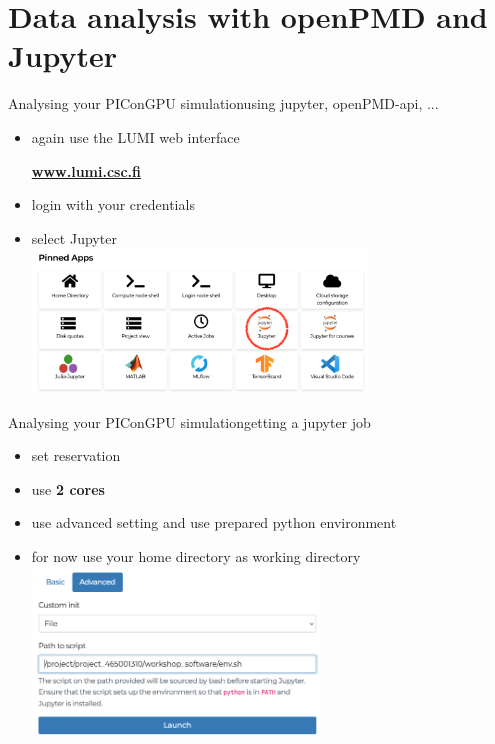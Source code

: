 \documentclass[
  aspectratio=169,
  10pt
]{beamer}
\begin{document}
\part{Data analysis with openPMD and Jupyter}
\frame{\partpage}


\begin{frame}[t,fragile]{Analysing your PIConGPU simulation}{using jupyter, openPMD-api, ...}

\begin{itemize}
    \item again use the LUMI web interface 
    \begin{center}\textbf{\url{www.lumi.csc.fi}}\end{center}
    \item login with your credentials 
    \item select Jupyter\\
    \includegraphics[width=0.7\textwidth]{images/LUMI_web_jupyter.png}
\end{itemize}

\end{frame}



\begin{frame}[t,fragile]{Analysing your PIConGPU simulation}{getting a jupyter job}

\begin{itemize}
    \item set reservation
    \item use \textbf{2 cores}
    \item use advanced setting and use prepared python environment 
    \item for now use your home directory as working directory
    \includegraphics[width=0.6\textwidth]{images/LUMI_jupyterSetup.png}
\end{itemize}

\end{frame}
\end{document}

